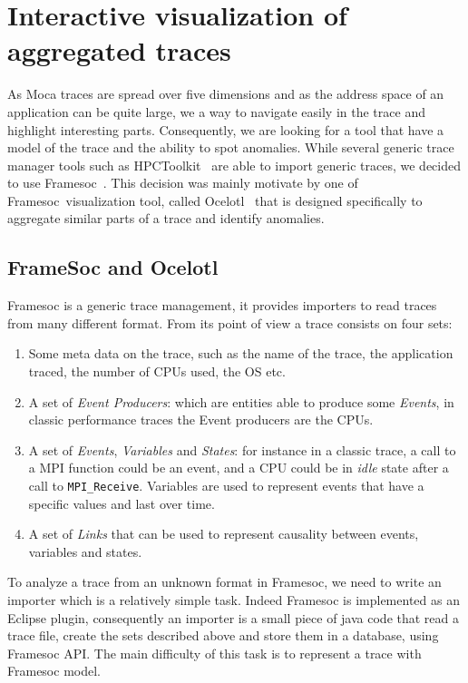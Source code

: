 \section{Interactive visualization of aggregated traces}
\label{sec:visu-first}

As \gls{Moca} traces are spread over five dimensions and as the address space of an application can be quite large, we a way to navigate easily in the trace and highlight interesting parts.
Consequently, we are looking for a tool that have a model of the trace and the ability to spot anomalies.
While several generic trace manager tools such as \gls{HPCToolkit}~\cite{Adhianto10HPCTOOLKIT} are able to import generic traces, we decided to use \gls{Framesoc}~\cite{Pagano14frameSoC}.
This decision was mainly motivate by one of \gls{Framesoc} visualization tool, called \gls{Ocelotl}~\cite{Dosimont14Ocelotl} that is designed specifically to aggregate similar parts of a trace and identify anomalies.

\subsection{FrameSoc and Ocelotl}

\gls{Framesoc} is a generic trace management, it provides importers to read traces from many different format.
From its point of view a trace consists on four sets:
\begin{enumerate}
    \item Some meta data on the trace, such as the name of the trace, the application traced, the number of \glspl{CPU} used, the \gls{OS} etc.
    \item A set of \emph{Event Producers}: which are entities able to produce some \emph{Events}, in classic performance traces the Event producers are the \glspl{CPU}.
    \item A set of \emph{Events}, \emph{Variables} and \emph{States}: for instance in a classic trace, a call to a \gls{MPI} function could be an event, and a \gls{CPU} could be in \emph{idle} state after a call to \texttt{MPI\_Receive}. Variables are used to represent events that have a specific values and last over time.
    \item A set of \emph{Links} that can be used to represent causality between events, variables and states.
\end{enumerate}

To analyze a trace from an unknown format in \gls{Framesoc}, we need to write an importer which is a relatively simple task.
Indeed \gls{Framesoc} is implemented as an Eclipse plugin, consequently an importer is a small piece of java code that read a trace file, create the sets described above and store them in a database, using \gls{Framesoc} \gls{API}.
The main difficulty of this task is to represent a trace with \gls{Framesoc} model.

